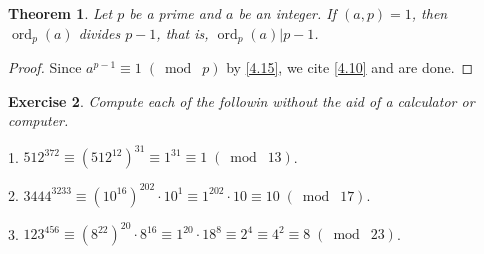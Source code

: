 \documentclass{article}
\DeclareMathOperator{\ord}{ord}
\newtheorem{thm}{Theorem}[section]
\newtheorem{ex}[thm]{Exercise}
\numberwithin{equation}{thm}
\providecommand{\gmod}[1]{\; (\bmod \; #1)}
\begin{document}
\begin{thm} \label{4.18}
  Let $p$ be a prime and $a$ be an integer. If $(a, p) = 1$, then $\ord_p (a)$ divides $p-1$, that is, $\ord_p(a) | p-1$.
\end{thm}

\begin{proof}
  Since $a^{p-1} \equiv 1 \gmod p$ by \ref{4.15}, we cite \ref{4.10} and are done.
\end{proof}



\begin{ex} \label{4.19}
  Compute each of the followin without the aid of a calculator or computer.
\end{ex}

1. $512^{372} \equiv (512^{12})^{31} \equiv 1^{31} \equiv 1 \gmod{13}$.

2. $3444^{3233} \equiv (10^{16})^{202} \cdot 10^1 \equiv 1^{202} \cdot 10 \equiv 10 \gmod{17}$.

3. $123^{456} \equiv (8^{22})^{20} \cdot 8^16 \equiv 1^{20} \cdot 18^8 \equiv 2^4 \equiv 4^2 \equiv 8 \gmod{23}$.
\end{document}
